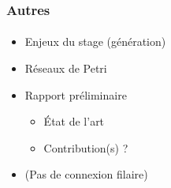 \documentclass{beamer}
\begin{document}
  \begin{frame}
    \frametitle{Autres}
    \framesubtitle{}

    \begin{itemize}
      \item Enjeux du stage (génération)
      \item Réseaux de Petri
      \item Rapport préliminaire
      \begin{itemize}
        \item État de l'art
        \item Contribution(s) ?
      \end{itemize}
      \item (Pas de connexion filaire)
    \end{itemize}
  \end{frame}
\end{document}
